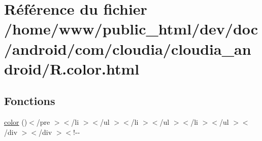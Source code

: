 \hypertarget{_r_8color_8html}{\section{Référence du fichier /home/www/public\-\_\-html/dev/doc/android/com/cloudia/cloudia\-\_\-android/\-R.color.\-html}
\label{_r_8color_8html}
}
\subsection*{Fonctions}
\begin{DoxyCompactItemize}
\item 
\hyperlink{_r_8color_8html_aab99a2d04cf9ba4836a987de67b92297}{color} ()$<$/pre $>$$<$/li $>$$<$/ul $>$$<$/li $>$$<$/ul $>$$<$/li $>$$<$/ul $>$$<$/div $>$$<$/div $>$$<$!-\/-\/
\end{DoxyCompactItemize}

